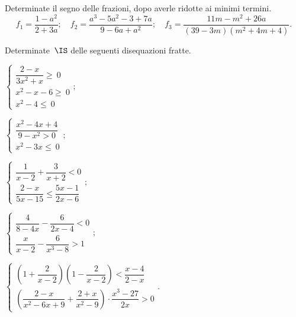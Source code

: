 \begin{esercizio}
\label{ese:21.66}
Determinate il segno delle frazioni, dopo averle ridotte ai minimi termini.
\[f_{1}=\dfrac{1-a^{2}}{2+3a};\quad f_{2}=\dfrac{a^{3}-5a^{2}-3+7a}{9-6a+a^{2}};\quad f_{3}=\dfrac{11m-m^{2}+26a}{(39-3m)(m^{2}+4m+4)}.\]
\end{esercizio}

\begin{esercizio}[\Ast]
\label{ese:21.67}
Determinate~\(\IS\) delle seguenti disequazioni fratte.
\begin{multicols}{2}
\begin{enumeratea}{\longarray
 \item \(\left\{\begin{array}{l}
  \dfrac{2-x}{3x^{2}+x}\ge~0\\
  x^{2}-x-6\ge~0\\
  x^{2}-4\le~0
        \end{array}\right.;\)
\item \(\left\{\begin{array}{l}
        \dfrac{x^{2}-4x+4}{9-x^{2}>0}\\
        x^{2}-3x\le~0
       \end{array}\right.;\)
\item \(\left\{\begin{array}{l}
           \dfrac{1}{x-2}+\dfrac{3}{x+2}<0\\
           \dfrac{2-x}{5x-15}\le\dfrac{5x-1}{2x-6}
           \end{array}\right.;\)
\item \(\left\{\begin{array}{l}
           \dfrac{4}{8-4x}-\dfrac{6}{2x-4}<0\\
           \dfrac{x}{x-2}-\dfrac{6}{x^{3}-8}>1
           \end{array}\right.;\)
\item \(\left\{\begin{array}{l}
           \left(1+\dfrac{2}{x-2}\right)\left(1-\dfrac{2}{x-2}\right)<\dfrac{x-4}{2-x}\\
           \left(\dfrac{2-x}{x^{2}-6x+9}+\dfrac{2+x}{x^{2}-9}\right)\cdot{\dfrac{x^{3}-27}{2x}}>0
           \end{array}\right..\)}
\end{enumeratea}
\end{multicols}
\end{esercizio}

